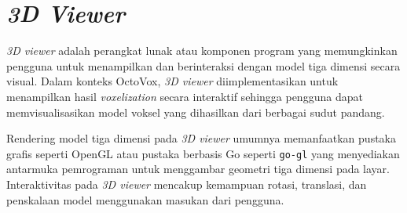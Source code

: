 \section{\textit{3D Viewer}}

\textit{3D viewer} adalah perangkat lunak atau komponen program yang memungkinkan
pengguna untuk menampilkan dan berinteraksi dengan model tiga dimensi secara
visual. Dalam konteks OctoVox, \textit{3D viewer} diimplementasikan untuk
menampilkan hasil \textit{voxelization} secara interaktif sehingga pengguna dapat
memvisualisasikan model voksel yang dihasilkan dari berbagai sudut pandang.

Rendering model tiga dimensi pada \textit{3D viewer} umumnya memanfaatkan
pustaka grafis seperti OpenGL atau pustaka berbasis Go seperti \texttt{go-gl} yang
menyediakan antarmuka pemrograman untuk menggambar geometri tiga dimensi pada
layar. Interaktivitas pada \textit{3D viewer} mencakup kemampuan rotasi, translasi,
dan penskalaan model menggunakan masukan dari pengguna.